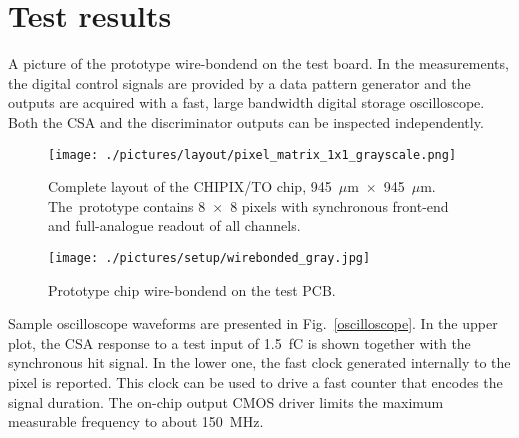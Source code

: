 \documentclass[conference]{./templates/IEEEtran/IEEEtran}
\begin{document}
\vspace*{0.7cm}

\section{Test results}
\noindent A picture of the prototype wire-bondend on the test board. In the measurements, the digital 
control signals are provided by a data pattern generator and the outputs are acquired with a fast, 
large bandwidth digital storage oscilloscope. Both the CSA and the discriminator outputs can be inspected 
independently.





\begin{center}
\begin{figure}[!htpb]
\centering
\texttt{[image: ./pictures/layout/pixel\_matrix\_1x1\_grayscale.png]}
\caption{Complete layout of the CHIPIX/TO chip, 945~$\mu$m~$\times$~945~$\mu$m. 
         The~prototype contains 8~$\times$~8 pixels with synchronous front-end and full-analogue 
		   readout of all channels.}  
\label{CHIPIX_VFE1_TO_final}
\end{figure}
\end{center}



\begin{center}
\begin{figure}[!htpb]
\centering
\texttt{[image: ./pictures/setup/wirebonded\_gray.jpg]}
\caption{Prototype chip wire-bondend on the test PCB.}  
\label{setup}
\end{figure}
\end{center}







Sample oscilloscope waveforms are presented in Fig.~\ref{oscilloscope}. In the upper plot, 
the CSA response to a test input of 1.5~fC is shown together with the synchronous hit signal. 
In the lower one, the fast clock generated internally to the pixel is reported. This clock can be 
used to drive a fast counter that encodes the signal duration. The on-chip output CMOS driver limits 
the maximum measurable frequency to about 150~MHz. 

\end{document}
